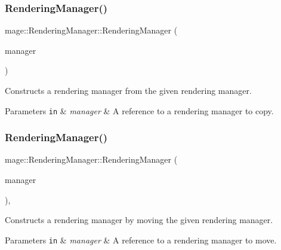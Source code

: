 \subsubsection{\texorpdfstring{Rendering\+Manager()}{RenderingManager()}\hspace{0.1cm}{\footnotesize\ttfamily [2/3]}}
{\footnotesize\ttfamily mage\+::\+Rendering\+Manager\+::\+Rendering\+Manager (\begin{DoxyParamCaption}\item[{const \hyperlink{classmage_1_1_rendering_manager}{Rendering\+Manager} \&}]{manager }\end{DoxyParamCaption})\hspace{0.3cm}{\ttfamily [delete]}}

Constructs a rendering manager from the given rendering manager.


\begin{DoxyParams}[1]{Parameters}
\mbox{\tt in}  & {\em manager} & A reference to a rendering manager to copy. \\
\hline
\end{DoxyParams}
\hypertarget{classmage_1_1_rendering_manager_a4e11d205eb43c4315c506c22b4e70254}{}\label{classmage_1_1_rendering_manager_a4e11d205eb43c4315c506c22b4e70254} 
\subsubsection{\texorpdfstring{Rendering\+Manager()}{RenderingManager()}\hspace{0.1cm}{\footnotesize\ttfamily [3/3]}}
{\footnotesize\ttfamily mage\+::\+Rendering\+Manager\+::\+Rendering\+Manager (\begin{DoxyParamCaption}\item[{\hyperlink{classmage_1_1_rendering_manager}{Rendering\+Manager} \&\&}]{manager }\end{DoxyParamCaption})\hspace{0.3cm}{\ttfamily [default]}, {\ttfamily [noexcept]}}

Constructs a rendering manager by moving the given rendering manager.


\begin{DoxyParams}[1]{Parameters}
\mbox{\tt in}  & {\em manager} & A reference to a rendering manager to move. \\
\hline
\end{DoxyParams}
\hypertarget{classmage_1_1_rendering_manager_a4164e70f014de8d0348c35d5142cedab}{}\label{classmage_1_1_rendering_manager_a4164e70f014de8d0348c35d5142cedab} 
